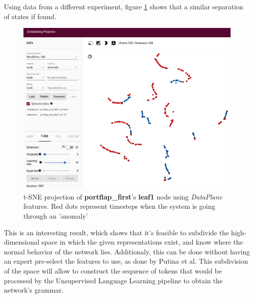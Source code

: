 Using data from a different experiment, figure \ref{fig:portflap_first_leaf1_DP} shows that a similar separation of states if found.
\begin{figure}[h!]
	\centering
	\includegraphics[width=0.8\linewidth]{Figure/portflap_first_leaf1_DP.png}
	\caption{t-SNE projection of \textbf{portflap\_first}'s \textbf{leaf1} node using \textit{DataPlane} features. Red dots represent timesteps when the system is going through an 'anomaly'}
	\label{fig:portflap_first_leaf1_DP}
\end{figure}

This is an interesting result, which shows that it's feasible to subdivide the high-dimensional space in which the given representations exist, and know where the normal behavior of the network lies.
Additionaly, this can be done without having an expert pre-select the features to use, as done by Putina et al\cite{putina_telemetry-based_2018}.
This subdivision of the space will allow to construct the sequence of tokens that would be processed by the Unsupervised Language Learning pipeline to obtain the network's grammar.


